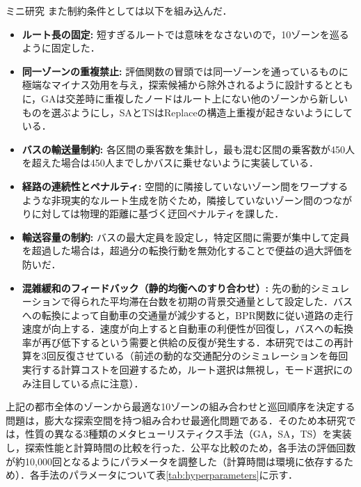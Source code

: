 \begin{column}{ミニ研究}
また制約条件としては以下を組み込んだ．
\begin{itemize}
    \item \textbf{ルート長の固定:} 短すぎるルートでは意味をなさないので，10ゾーンを巡るように固定した．
    \item \textbf{同一ゾーンの重複禁止:} 評価関数の冒頭では同一ゾーンを通っているものに極端なマイナス効用を与え，探索候補から除外されるように設計するとともに，GAは交差時に重複したノードはルート上にない他のゾーンから新しいものを選ぶようにし，SAとTSはReplaceの構造上重複が起きないようにしている．
    \item \textbf{バスの輸送量制約:} 各区間の乗客数を集計し，最も混む区間の乗客数が450人を超えた場合は450人までしかバスに乗せないように実装している．
    \item \textbf{経路の連続性とペナルティ:} 空間的に隣接していないゾーン間をワープするような非現実的なルート生成を防ぐため，隣接していないゾーン間のつながりに対しては物理的距離に基づく迂回ペナルティを課した．
    \item \textbf{輸送容量の制約:} バスの最大定員を設定し，特定区間に需要が集中して定員を超過した場合は，超過分の転換行動を無効化することで便益の過大評価を防いだ．
    \item \textbf{混雑緩和のフィードバック（静的均衡へのすり合わせ）:} 先の動的シミュレーションで得られた平均滞在台数を初期の背景交通量として設定した．バスへの転換によって自動車の交通量が減少すると，BPR関数に従い道路の走行速度が向上する．速度が向上すると自動車の利便性が回復し，バスへの転換率が再び低下するという需要と供給の反復が発生する．本研究ではこの再計算を3回反復させている（前述の動的な交通配分のシミュレーションを毎回実行する計算コストを回避するため，ルート選択は無視し，モード選択にのみ注目している点に注意）．
\end{itemize}

上記の都市全体のゾーンから最適な10ゾーンの組み合わせと巡回順序を決定する問題は，膨大な探索空間を持つ組み合わせ最適化問題である．そのため本研究では，性質の異なる3種類のメタヒューリスティクス手法（GA，SA，TS）を実装し，探索性能と計算時間の比較を行った．公平な比較のため，各手法の評価回数が約10,000回となるようにパラメータを調整した（計算時間は環境に依存するため）．各手法のパラメータについて表\ref{tab:hyperparameters}に示す．


\end{column}
